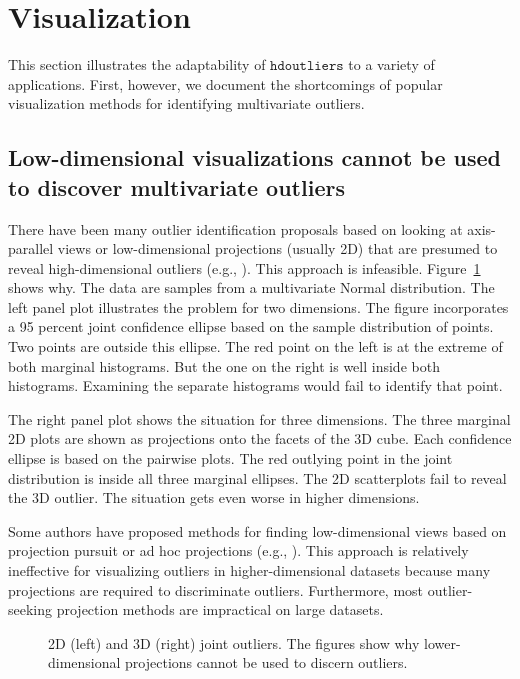 \documentclass[12pt]{article}
\begin{document}
\section{Visualization}
This section illustrates the adaptability of $\mathtt{hdoutliers}$ to a variety of applications. First, however, we document the shortcomings of popular visualization methods for identifying multivariate outliers.

\subsection{Low-dimensional visualizations cannot be used to discover multivariate outliers}
There have been many outlier identification proposals based on looking at axis-parallel views or low-dimensional projections (usually 2D) that are presumed to reveal high-dimensional outliers (e.g., \cite{Kandogan,Hinneburg,Kandogan:2001:VMC:502512.502530,KriegelKrogerSchubertZimek}). This approach is infeasible. Figure~\ref{fig:mahal} shows why. The data are samples from a multivariate Normal distribution. The left panel plot illustrates the problem for two dimensions. The figure incorporates a 95 percent joint confidence ellipse based on the sample distribution of points. Two points are outside this ellipse. The red point on the left is at the extreme of both marginal histograms. But the one on the right is well inside both histograms. Examining the separate histograms would fail to identify that point. 

The right panel plot shows the situation for three dimensions. The three marginal 2D plots are shown as projections onto the facets of the 3D cube. Each confidence ellipse is based on the pairwise plots. The red outlying point in the joint distribution is inside all three marginal ellipses. The 2D scatterplots fail to reveal the 3D outlier. The situation gets even worse in higher dimensions.

Some authors have proposed methods for finding low-dimensional views based on projection pursuit or ad hoc projections (e.g., \cite{BreabanLuchian,OutlierPP}). This approach is relatively ineffective for visualizing outliers in higher-dimensional datasets because many projections are required to discriminate outliers. Furthermore, most outlier-seeking projection methods are impractical on large datasets.

\begin{figure}[h]
\caption{\label{fig:mahal} 2D (left) and 3D (right) joint outliers. The figures show why lower-dimensional projections cannot be used to discern outliers.}
\end{figure}
\end{document}
